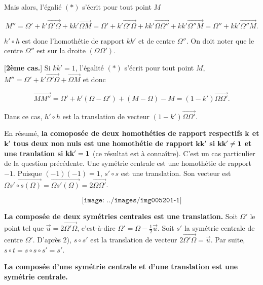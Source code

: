 {\begin{enumerate}
{\begin{itemize}
Mais alors, l'égalié $(*)$ s'écrit pour tout point $M$

$$M''=\Omega'+k'\overrightarrow{\Omega'\Omega}+kk'\overrightarrow{\Omega M}
=\Omega'+k'\overrightarrow{\Omega'\Omega}+kk'\overrightarrow{\Omega\Omega''}+kk'\overrightarrow{\Omega''M}
=\Omega''+kk'\overrightarrow{\Omega''M}.$$

$h'\circ h$ est donc l'homothétie de rapport $kk'$ et de centre $\Omega''$. On doit noter que le centre $\Omega''$ est sur la droite $(\Omega\Omega')$.

[\textbf{2ème cas.}] Si $kk'=1$, l'égalité $(*)$ s'écrit pour tout point $M$, $M''=\Omega'+k'\overrightarrow{\Omega'\Omega}+\overrightarrow{\Omega M}$ et donc

$$\overrightarrow{MM''}=\Omega'+k'(\Omega-\Omega')+(M-\Omega)-M=(1-k')\overrightarrow{\Omega\Omega'}.$$

Dans ce cas, $h'\circ h$ est la translation de vecteur $(1-k')\overrightarrow{\Omega\Omega'}$.
\end{itemize}

En résumé, \textbf{la comoposée de deux homothéties de rapport respectifs} $\bf{k}$ \textbf{et} $\bf{k'}$ \textbf{tous deux non nuls est une homothétie de rapport} $\bf{kk'}$ \textbf{si} $\bf{kk'}\neq1$ \textbf{et une tranlation si} $\bf{kk'=1}$ (ce résultat est à connaître).
C'est un cas particulier de la question précédente. Une symétrie centrale est une homothétie de rapport $-1$. Puisque $(-1)(-1)=1$, $s'\circ s$ est une translation. Son vecteur est $\overrightarrow{\Omega s'\circ s(\Omega)}=\overrightarrow{\Omega s'(\Omega)}=2\overrightarrow{\Omega \Omega'}$.

$$\texttt{[image: ../images/img005201-1]}$$

\textbf{La composée de deux symétries centrales est une translation.}
Soit $\Omega'$ le point tel que $\overrightarrow{u}=2\overrightarrow{\Omega'\Omega}$, c'est-à-dire 
$\Omega'=\Omega-\frac{1}{2}\overrightarrow{u}$. Soit $s'$ la symétrie centrale de centre $\Omega'$. D'après 2), $s\circ s'$ est la translation de vecteur $2\overrightarrow{\Omega'\Omega}=\overrightarrow{u}$. Par suite, $s\circ t=s\circ s\circ s'=s'$.

\textbf{La composée d'une symétrie centrale et d'une translation est une symétrie centrale.}
}
\end{enumerate}
}
